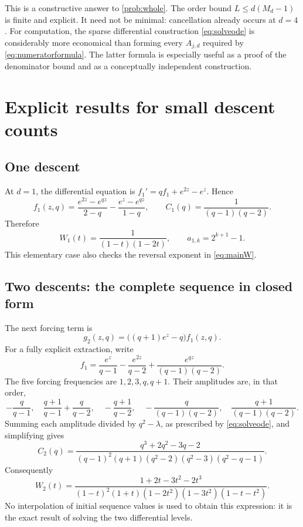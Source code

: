 \documentclass[11pt,letterpaper]{article}
\numberwithin{equation}{section}
\theoremstyle{definition}
\theoremstyle{remark}
\begin{document}
This is a constructive answer to \cref{prob:whole}. The order bound
$L\le d(M_d-1)$ is finite and explicit. It need not be minimal: cancellation
already occurs at $d=4$. For computation, the sparse differential
construction \eqref{eq:solveode} is considerably more economical than
forming every $A_{j,d}$ required by \eqref{eq:numeratorformula}.
The latter formula is especially useful as a proof of the denominator
bound and as a conceptually independent construction.

\section{Explicit results for small descent counts}\label{sec:examples}
\subsection{One descent}
At $d=1$, the differential equation is
$f_1'=qf_1+e^{2z}-e^z$. Hence
\[
 f_1(z,q)=\frac{e^{2z}-e^{qz}}{2-q}
          -\frac{e^z-e^{qz}}{1-q},\qquad
 C_1(q)=\frac{1}{(q-1)(q-2)}.
\]
Therefore
\begin{equation}\label{eq:W1}
 W_1(t)=\frac{1}{(1-t)(1-2t)},\qquad a_{1,k}=2^{k+1}-1.
\end{equation}
This elementary case also checks the reversal exponent in
\eqref{eq:mainW}.

\subsection{Two descents: the complete sequence in closed form}
The next forcing term is
\[
 g_2(z,q)=\bigl((q+1)e^z-q\bigr)f_1(z,q).
\]
For a fully explicit extraction, write
\[
 f_1=\frac{e^z}{q-1}-\frac{e^{2z}}{q-2}
           +\frac{e^{qz}}{(q-1)(q-2)}.
\]
The five forcing frequencies are $1,2,3,q,q+1$. Their amplitudes are,
in that order,
\[
 -\frac q{q-1},\quad
 \frac{q+1}{q-1}+\frac q{q-2},\quad
 -\frac{q+1}{q-2},\quad
 -\frac q{(q-1)(q-2)},\quad
 \frac{q+1}{(q-1)(q-2)}.
\]
Summing each amplitude divided by $q^2-\lambda$, as prescribed by
\eqref{eq:solveode}, and simplifying gives
\[
 C_2(q)=\frac{q^3+2q^2-3q-2}
 {(q-1)^2(q+1)(q^2-2)(q^2-3)(q^2-q-1)}.
\]
Consequently
\begin{equation}\label{eq:W2}
 \boxed{\displaystyle
 W_2(t)=\frac{1+2t-3t^2-2t^3}
 {(1-t)^2(1+t)(1-2t^2)(1-3t^2)(1-t-t^2)}.}
\end{equation}
No interpolation of initial sequence values is used to obtain this
expression: it is the exact result of solving the two differential
levels.
\end{document}
